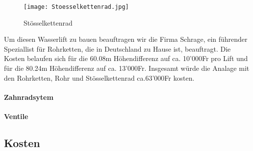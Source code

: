 \begin{figure} [H]
	\centering
	\texttt{[image: Stoesselkettenrad.jpg]}
	\caption{Stösselkettenrad \cite{schrage}}
	\label{fig:stoesselkettenrad}
\end{figure}


Um diesen Wasserlift zu bauen beauftragen wir die Firma Schrage, ein führender Speziallist für Rohrketten, die in Deutschland zu Hause ist, beauftragt. Die Kosten belaufen sich für die 60.08\si{m} Höhendifferenz auf ca. 10'000\si{Fr} pro Lift und für die 80.24\si{m} Höhendifferenz auf ca. 13'000\si{Fr}. Insgesamt würde die Analage mit den Rohrketten, Rohr und Stösselkettenrad ca.63'000\si{Fr} kosten. \cite{schrage}

\newpage

\paragraph{Zahnradsytem}

\paragraph{Ventile}



\subsection{Kosten}

